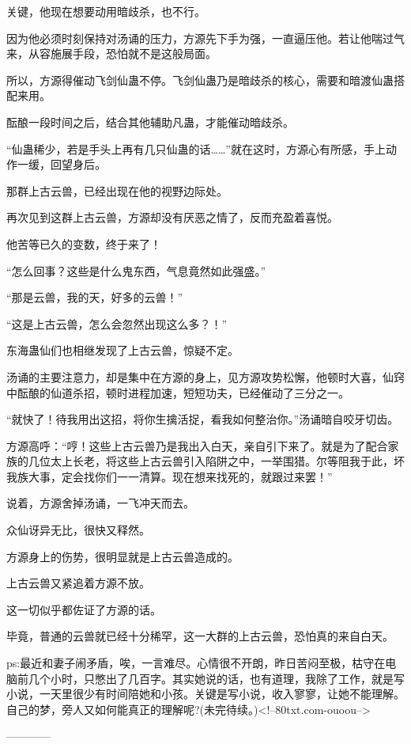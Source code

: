 \begin{this_body}
关键，他现在想要动用暗歧杀，也不行。

因为他必须时刻保持对汤诵的压力，方源先下手为强，一直逼压他。若让他喘过气来，从容施展手段，恐怕就不是这般局面。

所以，方源得催动飞剑仙蛊不停。飞剑仙蛊乃是暗歧杀的核心，需要和暗渡仙蛊搭配来用。

酝酿一段时间之后，结合其他辅助凡蛊，才能催动暗歧杀。

“仙蛊稀少，若是手头上再有几只仙蛊的话……”就在这时，方源心有所感，手上动作一缓，回望身后。

那群上古云兽，已经出现在他的视野边际处。

再次见到这群上古云兽，方源却没有厌恶之情了，反而充盈着喜悦。

他苦等已久的变数，终于来了！

“怎么回事？这些是什么鬼东西，气息竟然如此强盛。”

“那是云兽，我的天，好多的云兽！”

“这是上古云兽，怎么会忽然出现这么多？！”

东海蛊仙们也相继发现了上古云兽，惊疑不定。

汤诵的主要注意力，却是集中在方源的身上，见方源攻势松懈，他顿时大喜，仙窍中酝酿的仙道杀招，顿时进程加速，短短功夫，已经催动了三分之一。

“就快了！待我用出这招，将你生擒活捉，看我如何整治你。”汤诵暗自咬牙切齿。

方源高呼：“哼！这些上古云兽乃是我出入白天，亲自引下来了。就是为了配合家族的几位太上长老，将这些上古云兽引入陷阱之中，一举围猎。尔等阻我于此，坏我族大事，定会找你们一一清算。现在想来找死的，就跟过来罢！”

说着，方源舍掉汤诵，一飞冲天而去。

众仙讶异无比，很快又释然。

方源身上的伤势，很明显就是上古云兽造成的。

上古云兽又紧追着方源不放。

这一切似乎都佐证了方源的话。

毕竟，普通的云兽就已经十分稀罕，这一大群的上古云兽，恐怕真的来自白天。

ps:最近和妻子闹矛盾，唉，一言难尽。心情很不开朗，昨日苦闷至极，枯守在电脑前几个小时，只憋出了几百字。其实她说的话，也有道理，我除了工作，就是写小说，一天里很少有时间陪她和小孩。关键是写小说，收入寥寥，让她不能理解。自己的梦，旁人又如何能真正的理解呢?(未完待续。)<!--80txt.com-ouoou-->

------------

\end{this_body}

